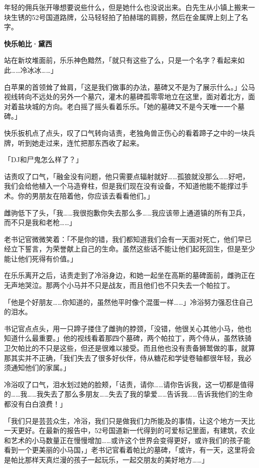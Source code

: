 年轻的佣兵张开喙想要说些什么，但是她什么也没说出来。白先生从小镇上搬来一块生锈的52号国道路牌，公马轻轻拍了拍赫瑞的肩膀，然后在金属牌上刻上了名字。

\begin{center}
    \textbf{快乐帕比·黛西}
\end{center}

站在新坟堆面前，乐乐神色黯然，「就只有这些了么，只是一个名字？看起来如此……冷冰冰……」

白苹果的首领耸了耸肩，「这是我们做事的办法，墓碑又不是为了展示什么。」公马视线转向不远处的另外一个墓穴，灌木的墓碑孤零零地立在这里，面对着北方，面对着盐块城的方向。老白摇了摇头看着乐乐。「她的墓碑又不是今天唯一一个墓碑。」

快乐扳机点了点头，叹了口气转向诘责，老独角兽正伤心的看着蹄子之中的一块兵牌，听到她走过来，连忙把那东西收了起来。

「DJ和尸鬼怎么样了？」

诘责叹了口气，「融金没有问题，他只需要点辐射就好……孤狼就没那么……好吧，我们会给他植入一个马造脊柱，但是我们现在没有设备，不知道他能不能撑过手术。你的男朋友在陪着他，你应该去看看他们。」

雌驹低下了头，「我……我很抱歉你失去那么多……我应该带上通道镇的所有卫兵，而不只是我和老枪……」

老书记官微微笑着：「不是你的错，我们都知道我们会有一天面对死亡，他们早已经立下誓言，为荣誉献上自己的生命。虽然这些话不能让他们起死回生，但是至少能让他们死得有价值。」

在乐乐离开之后，诘责走到了冷浴身边，和她一起坐在高斯的墓碑面前，雌驹正在无声地哭泣。那两个小马并不只是战友，而且他们也不只失去一个帕拉丁。

「他是个好朋友……你知道的，虽然他平时像个混蛋一样……」冷浴努力强忍住自己的泪水。

书记官点点头，用一只蹄子搂住了雌驹的脖颈，「没错，他很关心其他小马，他也知道什么最重要。」他的视线看着那四个墓碑，两个帕拉丁，两个侍从，虽然铁骑卫欠帕比的不只是这些，但还是很难以接受。而且他也没有责备狮鹫做的事，就算那其实并不正确，「我们失去了很多好伙伴，侍从糖花和学徒卷轴都很年轻，我必须通知他们的家属。」

冷浴叹了口气，泪水划过她的脸颊，「诘责，请你……请你告诉我，这一切都是值得的……我……我失去了那么多朋友……失去了我的挚爱……告诉我……告诉我他们的生命都没有白白浪费！」

「我们只是芸芸众生，冷浴，我们只是做我们力所能及的事情，让这个地方一天比一天更好。在最新的报告中，52号国道新一代得到的可爱标记里面，有建筑，农业和艺术的小马数量正在慢慢增加……或许这个世界会变得更好，或许我们的孩子能看到一个更美丽的小马国，」老书记官看着帕比的墓碑，「或许，有一天，这里将会是帕比那样天真烂漫的孩子一起玩乐，一起交朋友的美好地方……」

